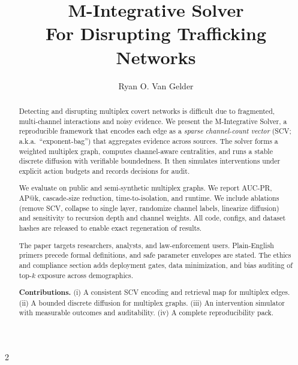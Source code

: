 \documentclass[12pt]{article}
\theoremstyle{plain}
\begin{document}
\nolinenumbers
\title{M-Integrative Solver\\For Disrupting Trafficking Networks}

\author{Ryan O. Van Gelder}

\maketitle
\begin{abstract}
Detecting and disrupting multiplex covert networks is difficult due to fragmented, multi-channel interactions and noisy evidence. We present the M-Integrative Solver, a reproducible framework that encodes each edge as a \emph{sparse channel-count vector} (SCV; a.k.a.\ “exponent-bag”) that aggregates evidence across sources. The solver forms a weighted multiplex graph, computes channel-aware centralities, and runs a stable discrete diffusion with verifiable boundedness. It then simulates interventions under explicit action budgets and records decisions for audit.

We evaluate on public and semi-synthetic multiplex graphs. We report AUC-PR, AP@k, cascade-size reduction, time-to-isolation, and runtime. We include ablations (remove SCV, collapse to single layer, randomize channel labels, linearize diffusion) and sensitivity to recursion depth and channel weights. All code, configs, and dataset hashes are released to enable exact regeneration of results.

The paper targets researchers, analysts, and law-enforcement users. Plain-English primers precede formal definitions, and safe parameter envelopes are stated. The ethics and compliance section adds deployment gates, data minimization, and bias auditing of top-$k$ exposure across demographics.

\textbf{Contributions.} (i) A consistent SCV encoding and retrieval map for multiplex edges. (ii) A bounded discrete diffusion for multiplex graphs. (iii) An intervention simulator with measurable outcomes and auditability. (iv) A complete reproducibility pack.
\end{abstract}



\newpage
\begin{multicols}{2}
\begin{singlespace}
\tableofcontents
\end{singlespace}
\end{multicols}
\end{document}
